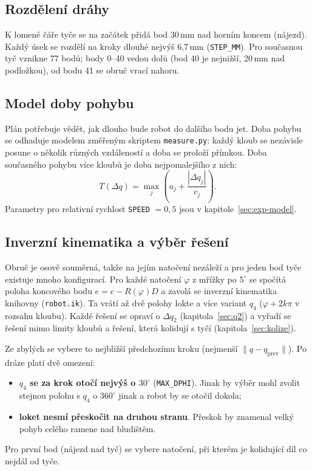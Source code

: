 \documentclass[11pt,a4paper]{article}
\begin{document}
\subsection{Rozdělení dráhy}

K lomené čáře tyče se na začátek přidá bod 30\,mm nad horním koncem (nájezd). Každý úsek se
rozdělí na kroky dlouhé nejvýš 6{,}7\,mm (\texttt{STEP\_MM}). Pro současnou tyč vznikne 77 bodů;
body 0--40 vedou dolů (bod 40 je nejnižší, 20\,mm nad podložkou), od bodu 41 se obruč vrací nahoru.

\subsection{Model doby pohybu}

Plán potřebuje vědět, jak dlouho bude robot do dalšího bodu jet. Doba pohybu se odhaduje
modelem změřeným skriptem \texttt{measure.py}: každý kloub se nezávisle posune o několik
různých vzdáleností a doba se proloží přímkou. Doba současného pohybu více kloubů je doba
nejpomalejšího z nich:
\begin{equation}
  T(\Delta q) = \max_j \left( a_j + \frac{|\Delta q_j|}{v_j} \right).
\end{equation}
Parametry pro relativní rychlost \texttt{SPEED} $= 0{,}5$ jsou v kapitole~\ref{sec:exp-model}.

\subsection{Inverzní kinematika a výběr řešení}

Obruč je osově souměrná, takže na jejím natočení nezáleží a pro jeden bod tyče existuje mnoho
konfigurací. Pro každé natočení $\varphi$ z mřížky po $5^\circ$ se spočítá poloha koncového
bodu $e = c - R(\varphi)D$ a zavolá se inverzní kinematika knihovny (\texttt{robot.ik}). Ta
vrátí až dvě polohy lokte a více variant $q_4$ ($\varphi + 2k\pi$ v rozsahu kloubu). Každé
řešení se opraví o $\Delta q_2$ (kapitola~\ref{sec:q2}) a vyřadí se řešení mimo limity kloubů
a řešení, která kolidují s tyčí (kapitola~\ref{sec:kolize}).

Ze zbylých se vybere to nejbližší předchozímu kroku (nejmenší $\|q - q_\mathrm{prev}\|$).
Po dráze platí dvě omezení:
\begin{itemize}
  \item \textbf{$q_4$ se za krok otočí nejvýš o $30^\circ$} (\texttt{MAX\_DPHI}). Jinak by výběr
        mohl zvolit stejnou polohu s $q_4$ o $360^\circ$ jinak a robot by se otočil dokola;
  \item \textbf{loket nesmí přeskočit na druhou stranu}. Přeskok by znamenal velký pohyb
        celého ramene nad bludištěm.
\end{itemize}
Pro první bod (nájezd nad tyč) se vybere natočení, při kterém je kolidující díl co nejdál
od tyče.
\end{document}
